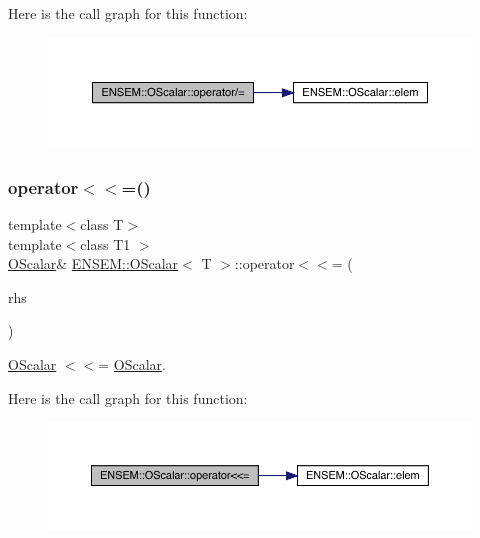 Here is the call graph for this function\+:
\nopagebreak
\begin{figure}[H]
\begin{center}
\leavevmode
\includegraphics[width=350pt]{da/d80/classENSEM_1_1OScalar_a1e0517e29754a8acb284c3ac266c2b2c_cgraph}
\end{center}
\end{figure}
\mbox{\label{classENSEM_1_1OScalar_a93607b92c63ae779d9d3ed131df3f449}} 
\subsubsection{\texorpdfstring{operator$<$$<$=()}{operator<<=()}\hspace{0.1cm}{\footnotesize\ttfamily [1/3]}}
{\footnotesize\ttfamily template$<$class T$>$ \\
template$<$class T1 $>$ \\
\mbox{\hyperlink{classENSEM_1_1OScalar}{O\+Scalar}}\& \mbox{\hyperlink{classENSEM_1_1OScalar}{E\+N\+S\+E\+M\+::\+O\+Scalar}}$<$ T $>$\+::operator$<$$<$= (\begin{DoxyParamCaption}\item[{const \mbox{\hyperlink{classENSEM_1_1OScalar}{O\+Scalar}}$<$ T1 $>$ \&}]{rhs }\end{DoxyParamCaption})\hspace{0.3cm}{\ttfamily [inline]}}



\mbox{\hyperlink{classENSEM_1_1OScalar}{O\+Scalar}} $<$$<$= \mbox{\hyperlink{classENSEM_1_1OScalar}{O\+Scalar}}. 

Here is the call graph for this function\+:
\nopagebreak
\begin{figure}[H]
\begin{center}
\leavevmode
\includegraphics[width=350pt]{da/d80/classENSEM_1_1OScalar_a93607b92c63ae779d9d3ed131df3f449_cgraph}
\end{center}
\end{figure}
\mbox{\label{classENSEM_1_1OScalar_a93607b92c63ae779d9d3ed131df3f449}} 
